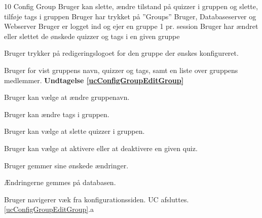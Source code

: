 \uchead
	{10} %
	{Config Group} %
	{Bruger kan slette, ændre tilstand på quizzer i gruppen og slette, tilføje tags i gruppen} %
	{Bruger har trykket på ''Groups''} %
	{Bruger, Databaseserver og Webserver} %
	{Bruger er logget ind og ejer en gruppe} %
	{} %
	{1 pr. session} %
	{Bruger har ændret eller slettet de ønskede quizzer og tags i en given gruppe} %


\item Bruger trykker på redigeringslogoet for den gruppe der ønskes konfigureret.

\item\label{ucConfigGroupEditGroup} Bruger for vist gruppens navn, quizzer og tags, samt en liste over gruppens medlemmer. \textbf{Undtagelse \ref{ucConfigGroupEditGroup}}

\item Bruger kan vælge at ændre gruppenavn.

\item Bruger kan ændre tags i gruppen.

\item Bruger kan vælge at slette quizzer i gruppen.

\item Bruger kan vælge at aktivere eller at deaktivere en given quiz.

\item Bruger gemmer sine ønskede ændringer.

\item Ændringerne gemmes på databasen.


\ucdescriptionend %

\ucextension
	{Bruger navigerer væk fra konfigurationssiden.}
	{UC afsluttes.}
	{\ref{ucConfigGroupEditGroup}.a}


